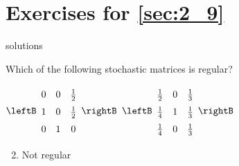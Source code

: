 \section*{Exercises for \ref{sec:2_9}}

\begin{Filesave}{solutions}
\end{Filesave}

\begin{multicols}{2}
\begin{ex}
Which of the following stochastic matrices is regular?
\begin{exenumerate}
\exitem $\leftB \def\arraystretch{1.5}\begin{array}{ccc}
0 & 0 & \frac{1}{2} \\
1 & 0 & \frac{1}{2} \\
0 & 1 & 0
\end{array} \rightB$
\exitem $\leftB \def\arraystretch{1.5}\begin{array}{ccc}
\frac{1}{2} & 0 & \frac{1}{3} \\
\frac{1}{4} & 1 & \frac{1}{3} \\
\frac{1}{4} & 0 & \frac{1}{3}
\end{array} \rightB$
\end{exenumerate}
\begin{sol}
\begin{enumerate}[label={\alph*.}]
\setcounter{enumi}{1}
\item  Not regular

\end{enumerate}
\end{sol}
\end{ex}


\end{multicols}
